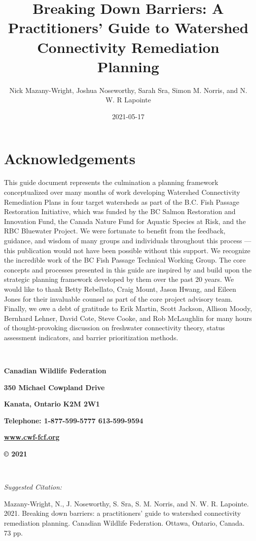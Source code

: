 \documentclass[
]{book}
\title{Breaking Down Barriers: A Practitioners' Guide to Watershed Connectivity Remediation Planning}
\author{Nick Mazany-Wright, Joshua Noseworthy, Sarah Sra, Simon M. Norris, and N. W. R Lapointe}
\date{2021-05-17}
\begin{document}
\maketitle

{
\setcounter{tocdepth}{1}
\tableofcontents
}
\hypertarget{acknowledgements}{%
\chapter*{Acknowledgements}\label{acknowledgements}}

This guide document represents the culmination a planning framework conceptualized over many months of work developing Watershed Connectivity Remediation Plans in four target watersheds as part of the B.C. Fish Passage Restoration Initiative, which was funded by the BC Salmon Restoration and Innovation Fund, the Canada Nature Fund for Aquatic Species at Risk, and the RBC Bluewater Project. We were fortunate to benefit from the feedback, guidance, and wisdom of many groups and individuals throughout this process --- this publication would not have been possible without this support.
We recognize the incredible work of the BC Fish Passage Technical Working Group. The core concepts and processes presented in this guide are inspired by and build upon the strategic planning framework developed by them over the past 20 years.
We would like to thank Betty Rebellato, Craig Mount, Jason Hwang, and Eileen Jones for their invaluable counsel as part of the core project advisory team. Finally, we owe a debt of gratitude to Erik Martin, Scott Jackson, Allison Moody, Bernhard Lehner, David Cote, Steve Cooke, and Rob McLaughlin for many hours of thought-provoking discussion on freshwater connectivity theory, status assessment indicators, and barrier prioritization methods.

~

\textbf{Canadian Wildlife Federation}

\textbf{350 Michael Cowpland Drive}

\textbf{Kanata, Ontario K2M 2W1}

\textbf{Telephone: 1-877-599-5777 \textbar{} 613-599-9594}

\href{https://cwf-fcf.org/en/}{\textbf{www.cwf-fcf.org}}

\textbf{© 2021}

~

\emph{Suggested Citation:}

Mazany-Wright, N., J. Noseworthy, S. Sra, S. M. Norris, and N. W. R. Lapointe. 2021. Breaking down barriers: a practitioners' guide to watershed connectivity remediation planning. Canadian Wildlife Federation. Ottawa, Ontario, Canada. 73 pp.
\end{document}

